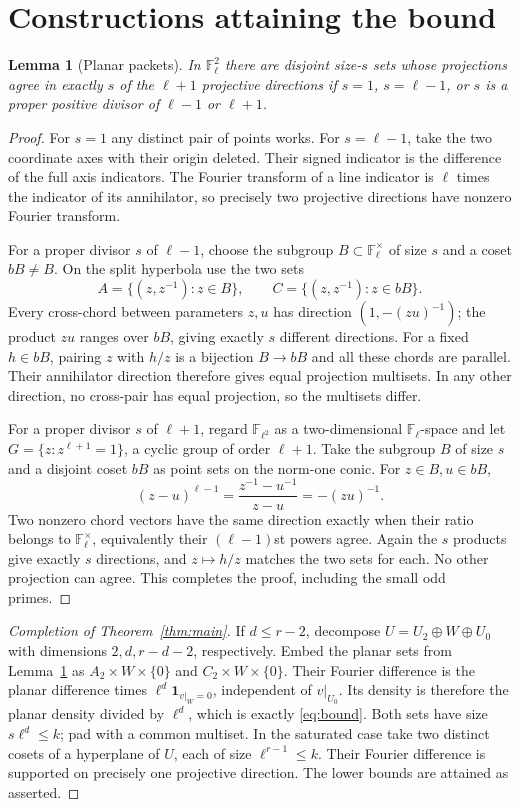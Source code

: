 \documentclass[11pt]{article}
\newtheorem{lemma}[theorem]{Lemma}
\theoremstyle{remark}\newtheorem{remark}[theorem]{Remark}
\newcommand{\F}{\mathbb F}
\newcommand{\ind}{\mathbf 1}
\begin{document}
\section{Constructions attaining the bound}
\begin{lemma}[Planar packets]\label{lem:plane}
In $\F_\ell^2$ there are disjoint size-$s$ sets whose projections agree in exactly $s$ of the $\ell+1$ projective directions if $s=1$, $s=\ell-1$, or $s$ is a proper positive divisor of $\ell-1$ or $\ell+1$.
\end{lemma}
\begin{proof}
For $s=1$ any distinct pair of points works. For $s=\ell-1$, take the two coordinate axes with their origin deleted. Their signed indicator is the difference of the full axis indicators. The Fourier transform of a line indicator is $\ell$ times the indicator of its annihilator, so precisely two projective directions have nonzero Fourier transform.

For a proper divisor $s$ of $\ell-1$, choose the subgroup $B\subset\F_\ell^\times$ of size $s$ and a coset $bB\ne B$. On the split hyperbola use the two sets
\[
 A=\{(z,z^{-1}):z\in B\},\qquad C=\{(z,z^{-1}):z\in bB\}.
\]
Every cross-chord between parameters $z,u$ has direction $(1,-(zu)^{-1})$; the product $zu$ ranges over $bB$, giving exactly $s$ different directions. For a fixed $h\in bB$, pairing $z$ with $h/z$ is a bijection $B\to bB$ and all these chords are parallel. Their annihilator direction therefore gives equal projection multisets. In any other direction, no cross-pair has equal projection, so the multisets differ.

For a proper divisor $s$ of $\ell+1$, regard $\F_{\ell^2}$ as a two-dimensional $\F_\ell$-space and let $G=\{z:z^{\ell+1}=1\}$, a cyclic group of order $\ell+1$. Take the subgroup $B$ of size $s$ and a disjoint coset $bB$ as point sets on the norm-one conic. For $z\in B,u\in bB$,
\[
 (z-u)^{\ell-1}=\frac{z^{-1}-u^{-1}}{z-u}=-(zu)^{-1}.
\]
Two nonzero chord vectors have the same direction exactly when their ratio belongs to $\F_\ell^\times$, equivalently their $(\ell-1)$st powers agree. Again the $s$ products give exactly $s$ directions, and $z\mapsto h/z$ matches the two sets for each. No other projection can agree. This completes the proof, including the small odd primes.
\end{proof}

\begin{proof}[Completion of Theorem~\ref{thm:main}]
If $d\le r-2$, decompose $U=U_2\oplus W\oplus U_0$ with dimensions $2,d,r-d-2$, respectively. Embed the planar sets from Lemma~\ref{lem:plane} as $A_2\times W\times\{0\}$ and $C_2\times W\times\{0\}$. Their Fourier difference is the planar difference times $\ell^d\ind_{v|_W=0}$, independent of $v|_{U_0}$. Its density is therefore the planar density divided by $\ell^d$, which is exactly \eqref{eq:bound}. Both sets have size $s\ell^d\le k$; pad with a common multiset. In the saturated case take two distinct cosets of a hyperplane of $U$, each of size $\ell^{r-1}\le k$. Their Fourier difference is supported on precisely one projective direction. The lower bounds are attained as asserted.
\end{proof}
\end{document}
